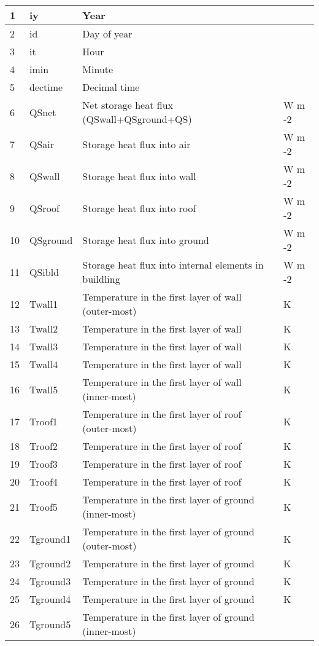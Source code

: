 \documentclass[letterpaper,10pt,english]{sphinxmanual}
\begin{document}
\begin{savenotes}
\begin{longtable}{|l|l|l|l|}
1
&
iy
&
Year
&\\
\hline
2
&
id
&
Day of year
&\\
\hline
3
&
it
&
Hour
&\\
\hline
4
&
imin
&
Minute
&\\
\hline
5
&
dectime
&
Decimal time
&\\
\hline
6
&
QSnet
&
Net storage heat flux (QSwall+QSground+QS)
&
W m -2
\\
\hline
7
&
QSair
&
Storage heat flux into air
&
W m -2
\\
\hline
8
&
QSwall
&
Storage heat flux into wall
&
W m -2
\\
\hline
9
&
QSroof
&
Storage heat flux into roof
&
W m -2
\\
\hline
10
&
QSground
&
Storage heat flux into ground
&
W m -2
\\
\hline
11
&
QSibld
&
Storage heat flux into internal elements in buildling
&
W m -2
\\
\hline
12
&
Twall1
&
Temperature in the first layer of wall (outer-most)
&
K
\\
\hline
13
&
Twall2
&
Temperature in the first layer of wall
&
K
\\
\hline
14
&
Twall3
&
Temperature in the first layer of wall
&
K
\\
\hline
15
&
Twall4
&
Temperature in the first layer of wall
&
K
\\
\hline
16
&
Twall5
&
Temperature in the first layer of wall (inner-most)
&
K
\\
\hline
17
&
Troof1
&
Temperature in the first layer of roof (outer-most)
&
K
\\
\hline
18
&
Troof2
&
Temperature in the first layer of roof
&
K
\\
\hline
19
&
Troof3
&
Temperature in the first layer of roof
&
K
\\
\hline
20
&
Troof4
&
Temperature in the first layer of roof
&
K
\\
\hline
21
&
Troof5
&
Temperature in the first layer of ground (inner-most)
&
K
\\
\hline
22
&
Tground1
&
Temperature in the first layer of ground (outer-most)
&
K
\\
\hline
23
&
Tground2
&
Temperature in the first layer of ground
&
K
\\
\hline
24
&
Tground3
&
Temperature in the first layer of ground
&
K
\\
\hline
25
&
Tground4
&
Temperature in the first layer of ground
&
K
\\
\hline
26
&
Tground5
&
Temperature in the first layer of ground (inner-most)

\end{longtable}
\end{savenotes}
\end{document}
